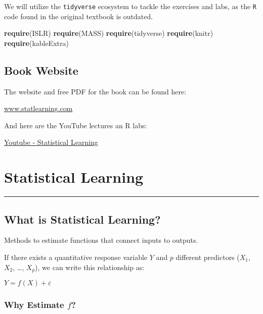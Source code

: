 \documentclass[]{book}
\newenvironment{Shaded}{\begin{snugshade}}{\end{snugshade}}
\newcommand{\KeywordTok}[1]{\textcolor[rgb]{0.13,0.29,0.53}{\textbf{#1}}}
\newcommand{\NormalTok}[1]{#1}
\theoremstyle{definition}
\theoremstyle{definition}
\theoremstyle{definition}
\theoremstyle{remark}
\begin{document}
We will utilize the \texttt{tidyverse} ecosystem to tackle the exercises
and labs, as the \texttt{R} code found in the original textbook is
outdated.

\begin{Shaded}
\begin{Highlighting}[]
\KeywordTok{require}\NormalTok{(ISLR)}
\KeywordTok{require}\NormalTok{(MASS)}
\KeywordTok{require}\NormalTok{(tidyverse)}
\KeywordTok{require}\NormalTok{(knitr)}
\KeywordTok{require}\NormalTok{(kableExtra)}
\end{Highlighting}
\end{Shaded}

\section{Book Website}\label{book-website}

The website and free PDF for the book can be found here:

\href{http://www-bcf.usc.edu/~gareth/ISL/}{www.statlearning.com}

And here are the YouTube lectures an R labs:

\href{https://www.youtube.com/channel/UC4OWDcPB1peiBXDfCSZ3h-w}{Youtube
- Statistical Learning}

\chapter{Statistical Learning}\label{statistical-learning}

\begin{center}\rule{0.5\linewidth}{\linethickness}\end{center}

\section{What is Statistical
Learning?}\label{what-is-statistical-learning}

Methods to estimate functions that connect inputs to outputs.

If there exists a quantitative response variable \(Y\) and \(p\)
different predictors (\(X_1\), \(X_2\), \ldots{}, \(X_p\)), we can write
this relationship as:

\(Y = f(X) + ε\)

\subsection{\texorpdfstring{Why Estimate
\emph{\(f\)}?}{Why Estimate f?}}\label{why-estimate-f}
\end{document}
